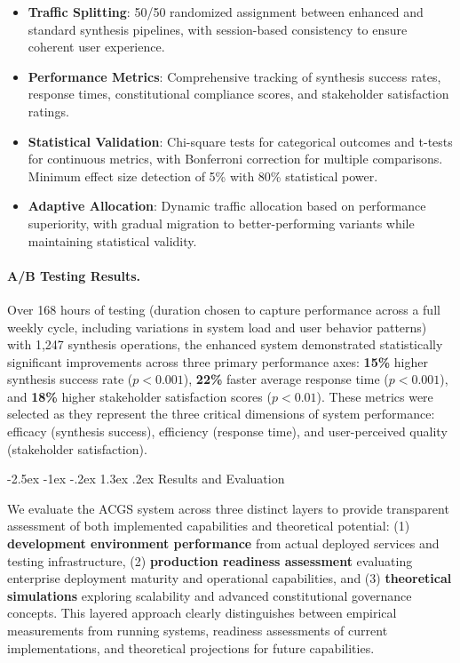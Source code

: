 \documentclass[manuscript,screen,9pt]{acmart}
\makeatletter
\renewcommand\section{\@startsection{section}{1}{\z@}%
  {-2.5ex \@plus -1ex \@minus -.2ex}%
  {1.3ex \@plus.2ex}%
  {\normalfont\Large\bfseries}}
\makeatother
\begin{document}
\begin{table}[!htb]
\begin{itemize}[leftmargin=*,itemsep=1pt,parsep=1pt]
    \item \textbf{Traffic Splitting}: 50/50 randomized assignment between enhanced and standard synthesis pipelines, with session-based consistency to ensure coherent user experience.
    \item \textbf{Performance Metrics}: Comprehensive tracking of synthesis success rates, response times, constitutional compliance scores, and stakeholder satisfaction ratings.
    \item \textbf{Statistical Validation}: Chi-square tests for categorical outcomes and t-tests for continuous metrics, with Bonferroni correction for multiple comparisons. Minimum effect size detection of 5\% with 80\% statistical power.
    \item \textbf{Adaptive Allocation}: Dynamic traffic allocation based on performance superiority, with gradual migration to better-performing variants while maintaining statistical validity.
\end{itemize}

\paragraph{A/B Testing Results.} Over 168 hours of testing (duration chosen to capture performance across a full weekly cycle, including variations in system load and user behavior patterns) with 1,247 synthesis operations, the enhanced system demonstrated statistically significant improvements across three primary performance axes: \textbf{15\%} higher synthesis success rate ($p < 0.001$), \textbf{22\%} faster average response time ($p < 0.001$), and \textbf{18\%} higher stakeholder satisfaction scores ($p < 0.01$). These metrics were selected as they represent the three critical dimensions of system performance: efficacy (synthesis success), efficiency (response time), and user-perceived quality (stakeholder satisfaction).

\section{Results and Evaluation}
\label{sec:results}

We evaluate the ACGS system across three distinct layers to provide transparent assessment of both implemented capabilities and theoretical potential: (1) \textbf{development environment performance} from actual deployed services and testing infrastructure, (2) \textbf{production readiness assessment} evaluating enterprise deployment maturity and operational capabilities, and (3) \textbf{theoretical simulations} exploring scalability and advanced constitutional governance concepts. This layered approach clearly distinguishes between empirical measurements from running systems, readiness assessments of current implementations, and theoretical projections for future capabilities.


\end{table}
\end{document}

